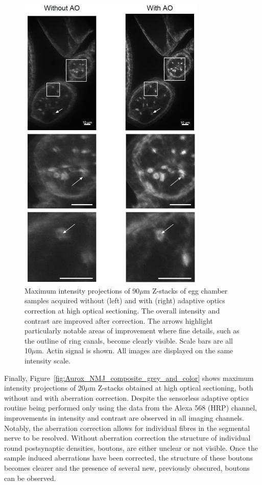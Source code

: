 \begin{figure}[h]
	\centering
	\includegraphics[width=0.8\textwidth]{images/Aurox_egg_chambers_composite.jpg}
	\caption{Maximum intensity projections of 90$\mu$m Z-stacks of egg 
		chamber samples acquired without (left) and with (right) adaptive 
		optics correction at high optical sectioning. The overall intensity 
		and contrast are improved after correction. The arrows highlight 
		particularly notable areas of improvement where fine details, such 
		as the outline of ring canals, become clearly visible. Scale bars 
		are all 10$\mu$m. Actin signal is shown. All images are displayed 
		on the same intensity scale.}
	\label{fig:Aurox_egg_chambers_composite}
\end{figure}

Finally, Figure~\ref{fig:Aurox_NMJ_composite_grey_and_color} shows maximum 
intensity projections of 20$\mu$m Z-stacks obtained at high optical 
sectioning, both without and with aberration correction. Despite the 
sensorless adaptive optics routine being performed only using the data 
from the Alexa 568 (HRP) channel, improvements in intensity and contrast
are observed in all imaging channels. Notably, the aberration correction 
allows for individual fibres in the segmental nerve to be resolved. Without
aberration correction the structure of individual round postsynaptic 
densities, boutons, are either unclear or not visible. Once the sample 
induced aberrations have been corrected, the structure of these boutons 
becomes clearer and the presence of several new, previously obscured, boutons 
can be observed.

